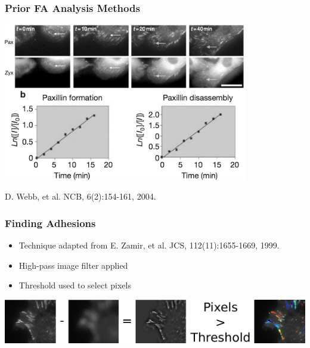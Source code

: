 \documentclass{beamer}
\newcommand{\figref}[1]{\begin{flushright}{\tiny #1 }\end{flushright}}
\begin{document}
\begin{frame}
	\frametitle{Prior FA Analysis Methods}
	\begin{center}
	\includegraphics[width=0.8\textwidth]{figures/finding/prior}
	\end{center}
	\figref{D. Webb, et al. NCB, 6(2):154-161, 2004.}
\end{frame}

\begin{frame}
	\frametitle{Finding Adhesions}
	 \begin{itemize}
	 \item Technique adapted from E. Zamir, et al. JCS, 112(11):1655-1669, 1999.
	 \item High-pass image filter applied
	 \item Threshold used to select pixels
	 \end{itemize}
	 \bigskip
	 \begin{center}
	 \includegraphics[width=\textwidth]{figures/finding/pixel_ID/adhesion_pixel_ID}
	 \end{center}
\end{frame}
\end{document}

